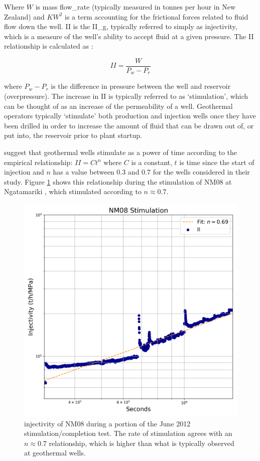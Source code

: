 Where $W$ is mass \gls{flow_rate} (typically measured in tonnes per hour in New Zealand) and $KW^{2}$ is a term accounting for the frictional forces related to fluid flow down the well. \acrshort{II} is the \gls{II_g}, typically referred to simply as \gls{injectivity}, which is a measure of the well's ability to accept fluid at a given pressure. The \acrshort{II} relationship is calculated as \citep{DiPippo_2016}:

\begin{equation}
II = \frac{W}{P_{w} - P_{r}}
\end{equation}

where $P_{w} - P_{r}$ is the difference in pressure between the well and reservoir (overpressure). The increase in \acrshort{II} is typically referred to as `\gls{stimulation}', which can be thought of as an increase of the \gls{permeability} of a well. Geothermal operators typically `stimulate' both production and injection wells once they have been drilled in order to increase the amount of fluid that can be drawn out of, or put into, the reservoir prior to plant startup.

\citet{grant2013thermal} suggest that geothermal wells stimulate as a power of time according to the empirical relationship: $II = Ct^{n}$ where $C$ is a constant, $t$ is time since the start of injection and $n$ has a value between 0.3 and 0.7 for the wells considered in their study. Figure \ref{415417} shows this relationship during the stimulation of NM08 at Ngatamariki \citep{Clearwater_2015}, which stimulated according to $n\approx0.7$.

\begin{figure}[h!]
\begin{center}
\includegraphics[width=0.70\columnwidth]{Chapter_1_Intro/figures/NM08_JC_ported_II_fitted/NM08_JC_ported_II_fitted}
\caption[Injectivity curve for NM08 stimulation]{{
\Gls{injectivity} of NM08 during a portion of the June 2012
stimulation\slash{completion} test. The rate of stimulation agrees with an
\(n\approx0.7\) relationship, which is higher than what is typically
observed at geothermal wells.
{\label{415417}}%
}}
\end{center}
\end{figure}

